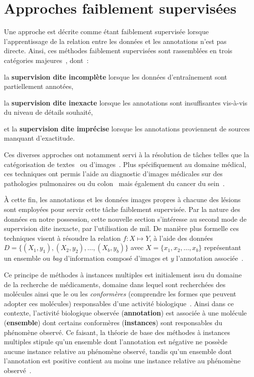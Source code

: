 \section{Approches faiblement supervisées}
\label{sec:patient_decision_weak}
Une approche est décrite comme étant faiblement supervisée lorsque l'apprentissage de la relation entre les données et les annotations n'est pas directe. Ainsi, ces méthodes faiblement supervisées sont rassemblées en trois catégories majeures~\cite{Zhou2018}, dont~:
\begin{inlinerate}
    \item la \textbf{supervision dite incomplète} lorsque les données d'entraînement sont partiellement annotées,
    \item la \textbf{supervision dite inexacte} lorsque les annotations sont insuffisantes vis-à-vis du niveau de détails souhaité,
    \item et la \textbf{supervision dite imprécise} lorsque les annotations proviennent de sources manquant d'exactitude.
\end{inlinerate} Ces diverses approches ont notamment servi à la résolution de tâches telles que la catégorisation de textes~\cite{Andrews2003,Settles2008} ou d'images~\cite{Chen2004,Tang2009}. Plus spécifiquement au domaine médical, ces techniques ont permis l'aide au diagnostic d'images médicales sur des pathologies pulmonaires ou du colon~\cite{Dundar2007} mais également du cancer du sein~\cite{Sudharshan2019}.\par

À cette fin, les annotations et les données images propres à chacune des lésions sont employées pour servir cette tâche faiblement supervisée. Par la nature des données en notre possession, cette nouvelle section s'intéresse au second mode de supervision dite inexacte, par l'utilisation de \gls{mil}. De manière plus formelle ces techniques visent à résoudre la relation $f: X \mapsto Y$, à l'aide des données $D=\{(X_1,y_1),(X_2,y_2),\ldots,(X_b,y_b)\}$ avec $X=\{x_1,x_2,\ldots,x_b\}$ représentant un ensemble ou \textit{bag} d'information composé d'images et $y$ l'annotation associée~\cite{foulds2010}.\par

Ce principe de méthodes à instances multiples est initialement issu du domaine de la recherche de médicaments, domaine dans lequel sont recherchées des molécules ainsi que le ou les \textit{conformères} (comprendre les formes que peuvent adopter ces molécules) responsables d'une activité biologique~\cite{Dietterich1997}. Ainsi dans ce contexte, l'activité biologique observée (\textbf{annotation}) est associée à une molécule (\textbf{ensemble}) dont certains conformères (\textbf{instances}) sont responsables du phénomène observé. Ce faisant, la théorie de base des méthodes à instances multiples stipule qu'un ensemble dont l'annotation est négative ne possède aucune instance relative au phénomène observé, tandis qu'un ensemble dont l'annotation est positive contient au moins une instance relative au phénomène observé~\cite{Dietterich1997}.\par

